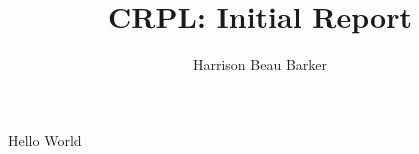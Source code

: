 \documentclass[11pt]{report}
\title{CRPL: Initial Report}
\author{Harrison Beau Barker}
\begin{document}
\maketitle

Hello World



\end{document}
